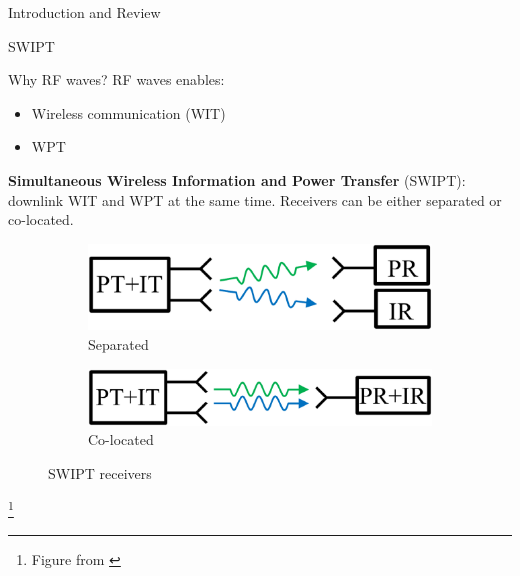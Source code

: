\documentclass[9pt]{beamer}
\newcommand\blfootnote[1]{%
\begingroup
\renewcommand\thefootnote{}\footnote{#1}%
\addtocounter{footnote}{-1}%
\endgroup
}
\begin{document}
\begin{section}{Introduction and Review}
	\begin{subsection}{SWIPT}
		\begin{frame}{Why RF waves?}
			RF waves enables:
			\begin{itemize}
				\item Wireless communication (WIT)
				\item WPT
			\end{itemize}
			\vspace{1em}
			\textbf{Simultaneous Wireless Information and Power Transfer} (SWIPT): downlink WIT and WPT at the same time. Receivers can be either separated or \alert{co-located}.
			\vspace{1em}
			\begin{figure}
				\centering
				\begin{subfigure}{0.48\textwidth}
					\centering
					\includegraphics[width=0.8\linewidth]{assets/wipt_receiver_separated.eps}
					\caption{Separated}
				\end{subfigure}%
				\begin{subfigure}{0.48\textwidth}
					\centering
					\includegraphics[width=0.8\linewidth]{assets/wipt_receiver_colocated.eps}
					\caption{Co-located}
				\end{subfigure}
				\caption{SWIPT receivers}
			\end{figure}
			\blfootnote{Figure from \cite{Clerckx2019}}
		\end{frame}


\end{subsection}
\end{section}
\end{document}
